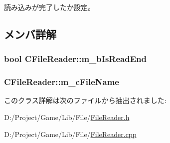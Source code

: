 読み込みが完了したか設定。 



\subsection{メンバ詳解}
\hypertarget{class_c_file_reader_a1eeeadefb7a22567093fca3f1efbc1d7}{}
\subsubsection[{m\+\_\+b\+Is\+Read\+End}]{\setlength{\rightskip}{0pt plus 5cm}bool C\+File\+Reader\+::m\+\_\+b\+Is\+Read\+End\hspace{0.3cm}{\ttfamily [private]}}\label{class_c_file_reader_a1eeeadefb7a22567093fca3f1efbc1d7}
\hypertarget{class_c_file_reader_a336f2d904f2b316d584b7fba8f996d69}{}
\subsubsection[{m\+\_\+c\+File\+Name}]{ C\+File\+Reader\+::m\+\_\+c\+File\+Name\hspace{0.3cm}{\ttfamily [private]}}\label{class_c_file_reader_a336f2d904f2b316d584b7fba8f996d69}


このクラス詳解は次のファイルから抽出されました\+:\begin{DoxyCompactItemize}
\item 
D\+:/\+Project/\+Game/\+Lib/\+File/\hyperlink{_file_reader_8h}{File\+Reader.\+h}\item 
D\+:/\+Project/\+Game/\+Lib/\+File/\hyperlink{_file_reader_8cpp}{File\+Reader.\+cpp}\end{DoxyCompactItemize}
